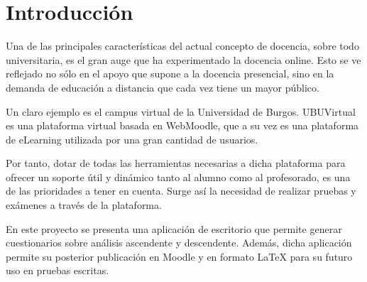
\section{Introducción}

Una de las principales características del actual concepto de docencia, sobre todo universitaria, es el gran auge que ha experimentado la docencia online. Esto se ve reflejado no sólo en el apoyo que supone a la docencia presencial, sino en la demanda de educación a distancia que cada vez tiene un mayor público.

Un claro ejemplo es el campus virtual de la Universidad de Burgos. UBUVirtual es una plataforma virtual basada en WebMoodle, que a su vez es una plataforma de eLearning utilizada por una gran cantidad de usuarios.

Por tanto, dotar de todas las herramientas necesarias a dicha plataforma para ofrecer un soporte útil y dinámico tanto al alumno como al profesorado, es una de las prioridades a tener en cuenta. Surge así la necesidad de realizar pruebas y exámenes a través de la plataforma.

En este proyecto se presenta una aplicación de escritorio que permite generar cuestionarios sobre análisis ascendente y descendente. Además, dicha aplicación permite su posterior publicación en Moodle y en formato \LaTeX{} para su futuro uso en pruebas escritas.














